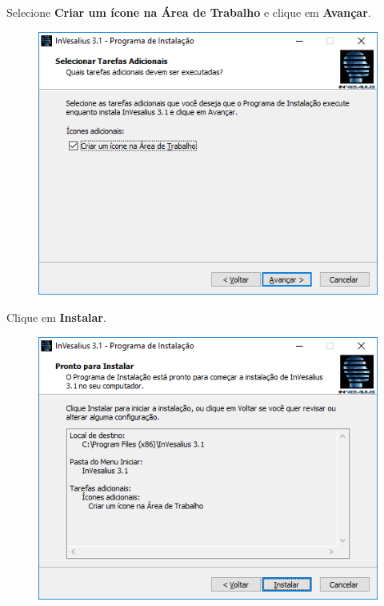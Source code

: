 \hspace{.2cm}

Selecione \textbf{Criar um ícone na Área de Trabalho} e clique em \textbf{Avançar}.

\begin{figure}[!htb]
\centering
\includegraphics[scale=0.7]{../user_guide_figures/invesalius_screen/installation_desktop_shortcut_pt.png}
\end{figure}

\newpage

Clique em \textbf{Instalar}.

\begin{figure}[!htb]
\centering
\includegraphics[scale=0.7]{../user_guide_figures/invesalius_screen/installation_resume_pt.png}
\end{figure}

